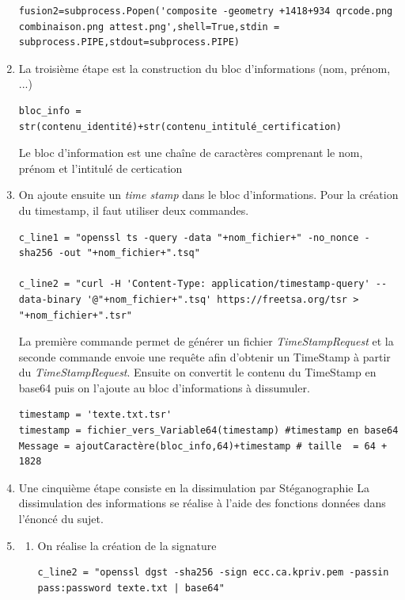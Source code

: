 \documentclass[12pt]{article}
\newcommand{\1}{\mathbbm{1}}
\begin{document}
\begin{enumerate}[label=(\arabic*)]
\begin{lstlisting}
fusion2=subprocess.Popen('composite -geometry +1418+934 qrcode.png combinaison.png attest.png',shell=True,stdin = subprocess.PIPE,stdout=subprocess.PIPE)
\end{lstlisting}		
\vspace*{7mm}
\item La troisième étape est la construction du bloc d'informations (nom, prénom, ...)

\begin{lstlisting}
bloc_info = str(contenu_identité)+str(contenu_intitulé_certification)
\end{lstlisting}
\vspace*{7mm}
Le bloc d'information est une chaîne de caractères comprenant le nom, prénom et l'intitulé de certication

\item On ajoute ensuite un \textit{time stamp} dans le bloc d'informations. Pour la création du timestamp, il faut utiliser deux commandes. 

\begin{lstlisting}
c_line1 = "openssl ts -query -data "+nom_fichier+" -no_nonce -sha256 -out "+nom_fichier+".tsq"
 
c_line2 = "curl -H 'Content-Type: application/timestamp-query' --data-binary '@"+nom_fichier+".tsq' https://freetsa.org/tsr > "+nom_fichier+".tsr"
\end{lstlisting}
\vspace*{7mm}
La première commande permet de générer un fichier \textit{TimeStampRequest} et la seconde commande envoie une requête afin d'obtenir un TimeStamp à partir du \textit{TimeStampRequest}. Ensuite on convertit le contenu du TimeStamp en base64 puis on l'ajoute au bloc d'informations à dissumuler.

\begin{lstlisting}
timestamp = 'texte.txt.tsr'
timestamp = fichier_vers_Variable64(timestamp) #timestamp en base64
Message = ajoutCaractère(bloc_info,64)+timestamp # taille  = 64 + 1828
\end{lstlisting}
\vspace*{7mm}
\item Une cinquième étape consiste en la dissimulation par Stéganographie \newline
La dissimulation des informations se réalise à l'aide des fonctions données dans l'énoncé du sujet.

\item

\begin{enumerate}[label=(\roman*)]
\item On réalise la création de la signature
\begin{lstlisting}
c_line2 = "openssl dgst -sha256 -sign ecc.ca.kpriv.pem -passin pass:password texte.txt | base64" 
	

\end{lstlisting}
\end{enumerate}
\end{enumerate}
\end{document}
